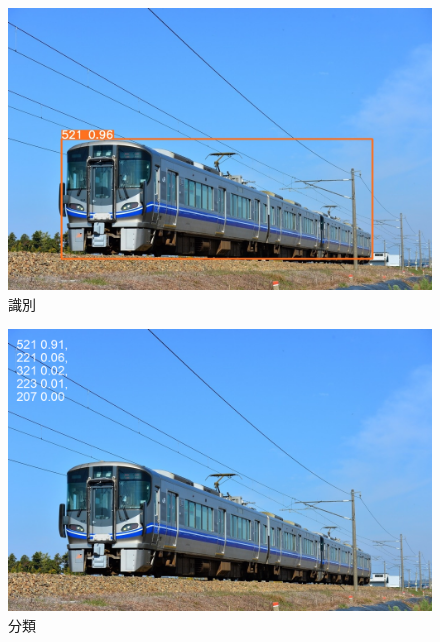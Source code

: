	
\begin{figure}
	
		\begin{center}
			\includegraphics[width=200mm]{fig/521_0.jpg}
		\end{center}
		\caption{識別}
		\label{fig:one}
\end{figure}

\begin{figure}
		\begin{center}
			\includegraphics[width=200mm]{fig/521_2.png}
		\end{center}
		\caption{分類}
		\label{fig:two}
\end{figure}

